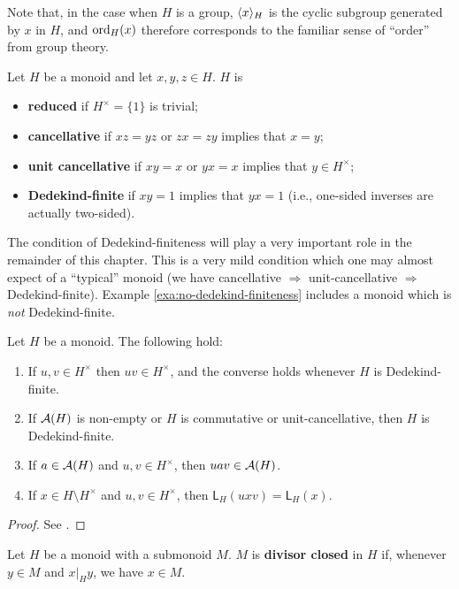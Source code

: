 Note that, in the case when $H$ is a group, $\langle x \rangle_H$ is the cyclic subgroup generated by $x$ in $H$, and ${\operatorname{ord}}_H(x)$ therefore corresponds to the familiar sense of ``order'' from group theory.


\begin{defn} \label{def:monoid properties}
	Let $H$ be a monoid and let $x,y,z\in H$.  
	$H$ is 
	\begin{itemize}
		\item \textbf{reduced} if $H^\times = \{1\}$ is trivial;
		\item \textbf{cancellative} if $xz = yz$ or $zx=zy$ implies that $x=y$;
		\item \textbf{unit cancellative} if $xy=x$ or $yx=x$ implies that $y\in H^\times$;
		\item \textbf{Dedekind-finite} if $xy=1$ implies that $yx=1$ (i.e., one-sided inverses are actually two-sided).
	\end{itemize}
\end{defn}
The condition of Dedekind-finiteness will play a very important role in the remainder of this chapter. 
This is a very mild condition which one may almost expect of a ``typical'' monoid (we have cancellative $\Rightarrow$ unit-cancellative $\Rightarrow$ Dedekind-finite).
Example \ref{exa:no-dedekind-finiteness} includes a monoid which is \textit{not} Dedekind-finite.


\begin{prop}\label{prop:unit-adjust}
	Let $H$ be a monoid.
	The following hold:
	\begin{enumerate}[label={\rm (\roman{*})}]
		\item\label{it:prop:unit-adjust(0)} If $u, v \in H^\times$ then $uv \in H^\times$, and the converse holds whenever $H$ is Dedekind-finite.
		\item\label{it:prop:unit-adjust(0b)} If $\mathcal{A}(H)$ is non-empty or $H$ is commutative or unit-cancellative, then $H$ is Dedekind-finite.
		\item\label{it:prop:unit-adjust(i)} If $a\in \mathcal{A}(H)$ and $u, v \in H^\times$, then $uav\in \mathcal{A}(H)$.
		\item\label{it:prop:unit-adjust(ii)} If $x\in H\setminus H^\times$ and $u, v \in H^\times$, then $\mathsf{L}_H(uxv) = \mathsf{L}_H(x)$.
	\end{enumerate}
\end{prop}
%
\begin{proof}
	See \cite[parts (i), (ii), and (iv) of Lemma 2.2, and Proposition 2.30]{fan-tringali18}.
\end{proof}
%
%
\begin{defn} \label{def:divisor closed}
	Let $H$ be a monoid with a submonoid $M$.
	$M$ is \textbf{divisor closed} in $H$ if, whenever $y\in M$ and $x|_H y$, we have $x\in M$.
\end{defn}

